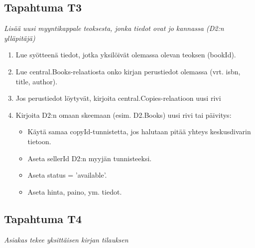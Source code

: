 \documentclass[11pt,a4paper]{article}
\begin{document}
\subsection{Tapahtuma T3}
{\large{\textit{Lisää uusi myyntikappale teoksesta, jonka tiedot ovat jo kannassa (D2:n ylläpitäjä)}}}

\begin{enumerate}
	\item Lue syötteenä tiedot, jotka yksilöivät olemassa olevan teoksen (bookId).
	\item Lue central.Books-relaatiosta onko kirjan perustiedot olemassa (vrt. isbn, title, author).
	\item Jos perustiedot löytyvät, kirjoita central.Copies-relaatioon uusi rivi
	\item Kirjoita D2:n omaan skeemaan (esim. D2.Books) uusi rivi tai päivitys:
	      \begin{itemize}
		      \item Käytä samaa copyId-tunnistetta, jos halutaan pitää yhteys keskusdivarin tietoon.
		      \item Aseta sellerId D2:n myyjän tunnisteeksi.
		      \item Aseta status = 'available'.
		      \item Aseta hinta, paino, ym. tiedot.
	      \end{itemize}
\end{enumerate}

\subsection{Tapahtuma T4}
{\large{\textit{Asiakas tekee yksittäisen kirjan tilauksen}}}
\end{document}
